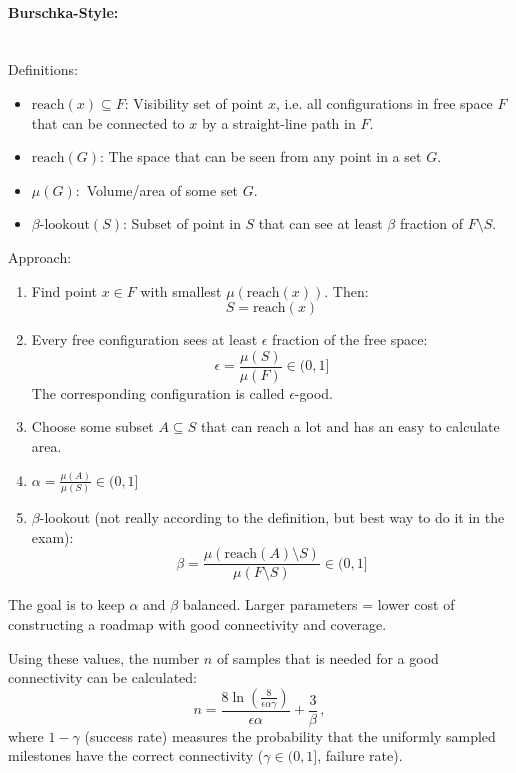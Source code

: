 \begin{multicols*}{2}
\paragraph{Burschka-Style:}\mbox{} \\
Definitions:
\begin{itemize}
	\item $\text{reach}(x) \subseteq F$: Visibility set of point $x$, i.e. all configurations in free space $F$ that can be connected to $x$ by a straight-line path in $F$.
	\item $\text{reach}(G)$: The space that can be seen from any point in a set $G$.
	\item $\mu(G):$ Volume/area of some set $G$.
	\item $\beta\text{-lookout}(S)$: Subset of point in $S$ that can see at least $\beta$ fraction of $F \setminus S$.
\end{itemize}
Approach:
\begin{enumerate}
	\item Find point $x \in F$ with smallest $\mu(\text{reach}(x))$. Then:
	\[S = \text{reach}(x)\]
	\item Every free configuration sees at least $\epsilon$ fraction of the free space:
	\[\epsilon = \frac{\mu(S)}{\mu(F)} \in (0,1]\]
	The corresponding configuration is called $\epsilon$-good.
	\item Choose some subset $A \subseteq S$ that can reach a lot and has an easy to calculate area.
	\item $\alpha = \frac{\mu(A)}{\mu(S)} \in (0,1]$
	\item $\beta$-lookout (not really according to the definition, but best way to do it in the exam): \[\beta = \frac{\mu(\text{reach}(A) \setminus S)}{\mu(F \setminus S)} \in (0,1]\]
\end{enumerate}
The goal is to keep $\alpha$ and $\beta$ balanced.
Larger parameters = lower cost of constructing a roadmap with good connectivity and coverage.

Using these values, the number $n$ of samples that is needed for a good connectivity can be calculated:
\[ n= \frac{8 \ln (\frac{8}{\epsilon\alpha\gamma})}{\epsilon\alpha} + \frac{3}{\beta} \,, \] 
where $1-\gamma$ (success rate) measures the probability that the uniformly sampled milestones have the correct connectivity ($\gamma \in (0,1]$, failure rate).


\end{multicols*}
